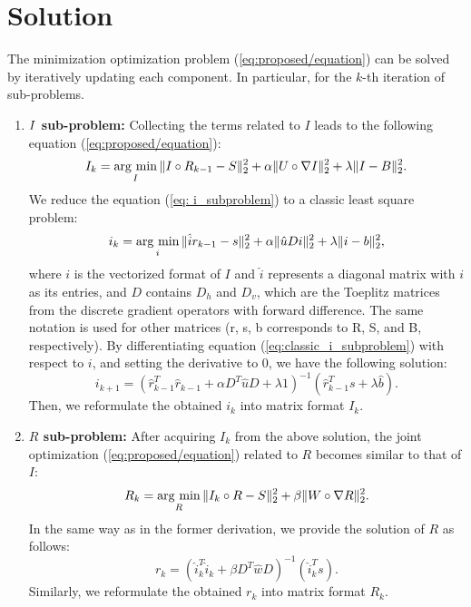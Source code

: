 \section{Solution} \label{sec:solution}
The minimization optimization problem (\ref{eq:proposed/equation}) can be solved by iteratively updating each component. In particular, for the $k$-th iteration of sub-problems.
\begin{enumerate}
\renewcommand{\labelenumi}{\arabic{enumi}).}
\item \textbf{$\boldmath{I}$ sub-problem:} Collecting the terms related to $I$ leads to the following equation (\ref{eq:proposed/equation}):
\begin{equation}
I_{k} = \mathop{\rm arg~min}\limits_{I}\|I \circ R_{k-1} - S\|_{2}^{2} + \alpha\|U \circ \nabla{I}\|_{2}^{2} 
+\lambda \|I - B\|_{2}^{2}. \label{eq: i_subproblem}
\end{equation}
We reduce the equation (\ref{eq: i_subproblem}) to a classic least square problem:
\begin{equation}
i_{k} = \mathop{\rm arg~min}\limits_{i} \|\hat{i}r_{k-1} - s\|_{2}^{2} + \alpha\|\hat{u}Di\|_{2}^{2} + \lambda \|i - b\|_{2}^{2}, \label{eq:classic_i_subproblem}
\end{equation}
where $i$ is the vectorized format of $I$ and $\hat{i}$ represents a diagonal matrix with $i$ as its entries, and $D$ contains $D_{h}$ and $D_{v}$, which are the Toeplitz matrices from the discrete gradient operators with forward difference.
The same notation is used for other matrices (r, s, b corresponds to R, S, and B, respectively). By differentiating equation (\ref{eq:classic_i_subproblem}) with respect to $i$, and setting the derivative to $0$, we have the following solution:
\begin{equation}
i_{k+1} = (\hat{r}_{k-1}^{T}\hat{r}_{k-1} + \alpha D^{T}\hat{u}D + \lambda{1})^{-1} (\hat{r}_{k-1}^{T}s + \lambda{\hat{b}}). \label{eq: i_solution}
\end{equation}
Then, we reformulate the obtained $i_{k}$ into matrix format $I_{k}$.
\item \textbf{$R$ sub-problem:} After acquiring $I_{k}$ from the above solution, the joint optimization (\ref{eq:proposed/equation}) related to $R$ becomes similar to that of $I$:
\begin{equation}
R_{k} = \mathop{\rm arg~min}\limits_{R}\|I_{k} \circ R - S\|_{2}^{2} + \beta\|W \circ \nabla{R}\|_{2}^{2}. \label{eq: r_subproblem}
\end{equation}
In the same way as in the former derivation, we provide the solution of $R$ as follows:
\begin{equation}
r_{k} = (\hat{i}_{k}^{T}\hat{i}_{k} + \beta D^{T}\hat{w}D)^{-1} (\hat{i}_{k}^{T}s). \label{eq: solution_r_subproblem}
\end{equation}
Similarly, we reformulate the obtained $r_{k}$ into matrix format $R_{k}$.
\end{enumerate}

